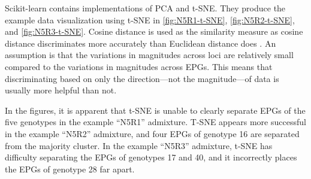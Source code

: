 Scikit-learn \cite{pedregosa_scikit-learn_2011} contains implementations of PCA and t-SNE. They produce the example data visualization using t-SNE in \cref{fig:N5R1-t-SNE}, \cref{fig:N5R2-t-SNE}, and \cref{fig:N5R3-t-SNE}. Cosine distance is used as the similarity measure as cosine distance discriminates more accurately than Euclidean distance does \cite{odonnell_clustering_2021}. An assumption is that the variations in magnitudes across loci are relatively small compared to the variations in magnitudes across EPGs. This means that discriminating based on only the direction---not the magnitude---of data is usually more helpful than not.

In the figures, it is apparent that t-SNE is unable to clearly separate EPGs of the five genotypes in the example ``N5R1'' admixture. T-SNE appears more successful in the example ``N5R2'' admixture, and four EPGs of genotype 16 are separated from the majority cluster. In the example ``N5R3'' admixture, t-SNE has difficulty separating the EPGs of genotypes 17 and 40, and it incorrectly places the EPGs of genotype 28 far apart.

